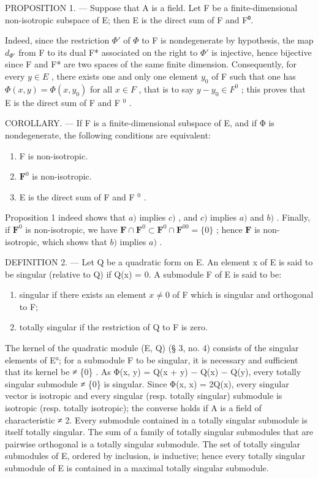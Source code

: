 PROPOSITION 1. --- Suppose that A is a field. Let F be a finite-dimensional non-isotropic subspace of E; then E is the direct sum of F and F⁰.

Indeed, since the restriction \(\Phi'\) of \(\Phi\) to F is nondegenerate by hypothesis, the map \(d_{\Phi'}\) from F to its dual F* associated on the right to \(\Phi'\) is injective, hence bijective since F and F* are two spaces of the same finite dimension. Consequently, for every \(y \in E\) , there exists one and only one element \(y_0\) of F such that one has \(\Phi(x, y) = \Phi(x, y_0)\) for all \(x \in F\) , that is to say \(y - y_0 \in F^0\) ; this proves that E is the direct sum of F and F \(^0\) .

COROLLARY. --- If F is a finite-dimensional subspace of E, and if Φ is nondegenerate, the following conditions are equivalent:

\begin{enumerate}
\def\labelenumi{\alph{enumi})}
\item
  F is non-isotropic.
\item
  \(\mathbf{F}^0\) is non-isotropic.
\item
  E is the direct sum of F and F \(^{0}\) .
\end{enumerate}

Proposition 1 indeed shows that \(a)\) implies \(c)\) , and \(c)\) implies \(a)\) and \(b)\) . Finally, if \(\mathbf{F}^0\) is non-isotropic, we have \(\mathbf{F} \cap \mathbf{F}^0 \subset \mathbf{F}^0 \cap \mathbf{F}^{00} = \{0\}\) ; hence \(\mathbf{F}\) is non-isotropic, which shows that \(b)\) implies \(a)\) .

DEFINITION 2. --- Let Q be a quadratic form on E. An element x of E is said to be singular (relative to Q) if Q(x) = 0. A submodule F of E is said to be:

\begin{enumerate}
\def\labelenumi{\arabic{enumi})}
\item
  singular if there exists an element \(x \neq 0\) of F which is singular and orthogonal to F;
\item
  totally singular if the restriction of Q to F is zero.
\end{enumerate}

The kernel of the quadratic module (E, Q) (§ 3, no. 4) consists of the singular elements of E°; for a submodule F to be singular, it is necessary and sufficient that its kernel be ≠ \{0\} . As Φ(x, y) = Q(x + y) − Q(x) − Q(y), every totally singular submodule ≠ \{0\} is singular. Since Φ(x, x) = 2Q(x), every singular vector is isotropic and every singular (resp. totally singular) submodule is isotropic (resp. totally isotropic); the converse holds if A is a field of characteristic ≠ 2. Every submodule contained in a totally singular submodule is itself totally singular. The sum of a family of totally singular submodules that are pairwise orthogonal is a totally singular submodule. The set of totally singular submodules of E, ordered by inclusion, is inductive; hence every totally singular submodule of E is contained in a maximal totally singular submodule.

